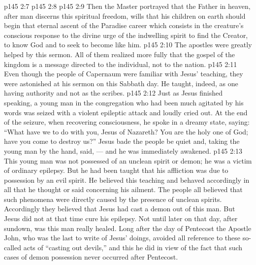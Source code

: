 \vs p145 2:7 
\vs p145 2:8 
\vs p145 2:9 Then the Master portrayed that the Father in heaven, after man discerns this spiritual freedom, wills that his children on earth should begin that eternal ascent of the Paradise career which consists in the creature’s conscious response to the divine urge of the indwelling spirit to find the Creator, to know God and to seek to become like him.
\vs p145 2:10 \pc The apostles were greatly helped by this sermon. All of them realized more fully that the gospel of the kingdom is a message directed to the individual, not to the nation.
\vs p145 2:11 Even though the people of Capernaum were familiar with Jesus’ teaching, they were astonished at his sermon on this Sabbath day. He taught, indeed, as one having authority and not as the scribes.
\vs p145 2:12 \pc Just as Jesus finished speaking, a young man in the congregation who had been much agitated by his words was seized with a violent epileptic attack and loudly cried out. At the end of the seizure, when recovering consciousness, he spoke in a dreamy state, saying: “What have we to do with you, Jesus of Nazareth? You are the holy one of God; have you come to destroy us?” Jesus bade the people be quiet and, taking the young man by the hand, said,  --- and he was immediately awakened.
\vs p145 2:13 This young man was not possessed of an unclean spirit or demon; he was a victim of ordinary epilepsy. But he had been taught that his affliction was due to possession by an evil spirit. He believed this teaching and behaved accordingly in all that he thought or said concerning his ailment. The people all believed that such phenomena were directly caused by the presence of unclean spirits. Accordingly they believed that Jesus had cast a demon out of this man. But Jesus did not at that time cure his epilepsy. Not until later on that day, after sundown, was this man really healed. Long after the day of Pentecost the Apostle John, who was the last to write of Jesus’ doings, avoided all reference to these so\hyp{}called acts of “casting out devils,” and this he did in view of the fact that such cases of demon possession never occurred after Pentecost.
